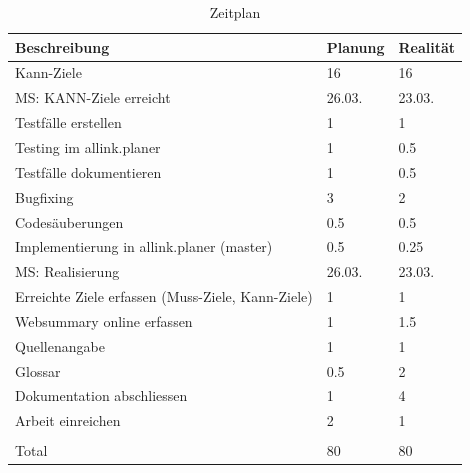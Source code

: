 \begin{table}[!ht]
\begin{center}      
     \begin{tabular}{lll}
        \toprule Beschreibung & Planung & Realität \\
        \midrule Kann-Ziele & 16 & 16\\
        \midrule MS: KANN-Ziele erreicht & 26.03. & 23.03.\\
        \midrule Testfälle erstellen & 1 & 1\\
        \midrule Testing im allink.planer & 1 & 0.5\\
        \midrule Testfälle dokumentieren & 1 & 0.5\\
        \midrule Bugfixing & 3 & 2\\
        \midrule Codesäuberungen & 0.5 & 0.5\\
        \midrule Implementierung in allink.planer (master) & 0.5 & 0.25\\
        \midrule MS: Realisierung & 26.03. & 23.03.\\
        \midrule Erreichte Ziele erfassen (Muss-Ziele, Kann-Ziele) & 1 & 1\\
        \midrule Websummary online erfassen & 1 & 1.5\\
        \midrule Quellenangabe & 1 & 1\\
        \midrule Glossar & 0.5 & 2\\
        \midrule Dokumentation abschliessen & 1 & 4\\
        \midrule Arbeit einreichen & 2 & 1\\
        \midrule & &\\
        \midrule Total & 80 & 80\\
        \bottomrule
    \end{tabular}
    \caption{Zeitplan}
\end{center}
\end{table}
